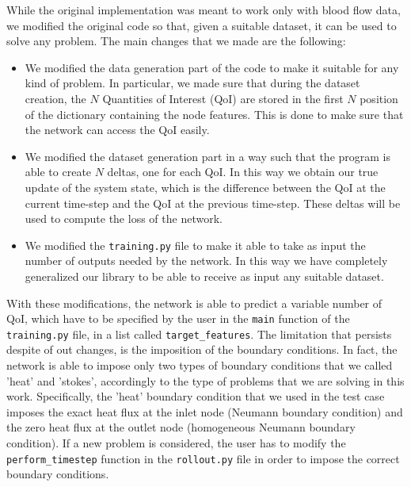 \documentclass[11pt,a4paper]{article}
\begin{document}
While the original implementation was meant to work only with blood flow data, we modified the original code so that, given a suitable dataset, it can be used to solve any problem. The main changes that we made are the following:
\begin{itemize}
    \item We modified the data generation part of the code to make it suitable for any kind of problem. In particular, we made sure that during the dataset creation, the \(N\) Quantities of Interest (QoI) are stored in the first \(N\) position of the dictionary containing the node features. This is done to make sure that the network can access the QoI easily. 
    \item We modified the dataset generation part in a way such that the program is able to create \(N\) deltas, one for each QoI. In this way we obtain our true update of the system state, which is the difference between the QoI at the current time-step and the QoI at the previous time-step. These deltas will be used to compute the loss of the network. 
    \item We modified the \texttt{training.py} file to make it able to take as input the number of outputs needed by the network. In this way we have completely generalized our library to be able to receive as input any suitable dataset.
\end{itemize}

With these modifications, the network is able to predict a variable number of QoI, which have to be specified by the user in the \texttt{main} function of the \texttt{training.py} file, in a list called \texttt{target\_features}. 
The limitation that persists despite of out changes, is the imposition of the boundary conditions. In fact, the network is able to impose only two types of boundary conditions that we called 'heat' and 'stokes', accordingly to the type of problems that we are solving in this work. Specifically, the 'heat' boundary condition that we used in the test case imposes the exact heat flux at the inlet node (Neumann boundary condition) and the zero heat flux at the outlet node (homogeneous Neumann boundary condition). If a new problem is considered, the user has to modify the \texttt{perform\_timestep} function in the \texttt{rollout.py} file in order to impose the correct boundary conditions.
    
\end{document}
